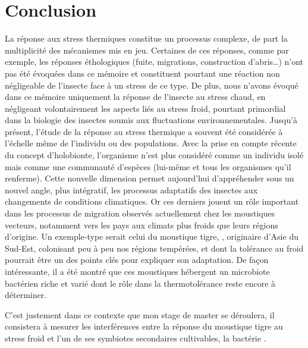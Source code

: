 
\section*{Conclusion}

La réponse aux stress thermiques constitue un processus complexe, de part la multiplicité des mécanismes mis en jeu. 
Certaines de ces réponses, comme par exemple, les réponses éthologiques (fuite, migrations, construction d'abris\ldots)  n'ont pas été évoquées dans ce mémoire et constituent pourtant une réaction non négligeable de l'insecte face à un stress de ce type.
De plus, nous n'avons évoqué dans ce mémoire uniquement la réponse de l'insecte au stress chaud, en négligeant volontairement les aspects liés au stress froid, pourtant primordial dans la biologie des insectes soumis aux fluctuations environnementales.
Jusqu'à présent, l'étude de la réponse au stress thermique a souvent été considérée à l'échelle même de l'individu ou des populations.
Avec la prise en compte récente du concept d'holobionte, l'organisme n'est plus considéré comme un individu isolé mais comme une communauté d'espèces (lui-même et tous les organismes qu'il renferme).
Cette nouvelle dimension permet aujourd'hui d'appréhender sous un nouvel angle, plus intégratif, les processus adaptatifs des insectes aux changements de conditions climatiques.
Or ces derniers jouent un rôle important dans les processus de migration observés actuellement chez les moustiques vecteurs, notamment vers les pays aux climats plus froids que leurs régions d'origine.
Un exemple-type serait celui du moustique tigre, , originaire d'Asie du Sud-Est, colonisant peu à peu nos régions tempérées, et dont la tolérance au froid pourrait être un des points clés pour expliquer son adaptation.
De façon intéressante, il a été montré que ces moustiques hébergent un microbiote bactérien riche et varié dont le rôle dans la thermotolérance reste encore à déterminer.

C'est justement dans ce contexte que mon stage de master se déroulera, il consistera à mesurer les interférences entre la réponse du moustique tigre  au stress froid et l'un de ses symbiotes secondaires cultivables, la bactérie .

